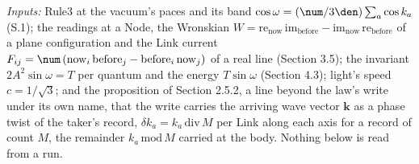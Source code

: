 \begin{derivation}
\emph{Inputs:} Rule3 at the vacuum's paces and its band $\cos\omega = (\num / 3\den)\sum_a \cos k_a$ (S.1); the readings at a Node, the Wronskian $W = \mathrm{re}_{\mathrm{now}}\,\mathrm{im}_{\mathrm{before}} - \mathrm{im}_{\mathrm{now}}\,\mathrm{re}_{\mathrm{before}}$ of a plane configuration and the Link current $F_{ij} = \num\,(\mathrm{now}_i\,\mathrm{before}_j - \mathrm{before}_i\,\mathrm{now}_j)$ of a real line (Section 3.5); the invariant $2A^2\sin\omega = T$ per quantum and the energy $T\sin\omega$ (Section 4.3); light's speed $c = 1 / \sqrt 3$; and the proposition of Section 2.5.2, a line beyond the law's write under its own name, that the write carries the arriving wave vector $\mathbf k$ as a phase twist of the taker's record, $\delta k_a = k_a\,\mathrm{div}\,M$ per Link along each axis for a record of count $M$, the remainder $k_a\,\mathrm{mod}\,M$ carried at the body. Nothing below is read from a run.

\end{derivation}
